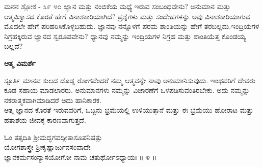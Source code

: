 \newpage
\begin{mananam}{\mananamfont \large ಮನನ ಶ್ಲೋಕ - ೩೯ ೪೦}
\mananamtext ಜ್ಞಾನ ಮತ್ತು ನಂಬಿಕೆಯ ಮಧ್ಯೆ ಇರುವ ಸಂಬಂಧವೇನು? ಅನುಮಾನ ಮತ್ತು ಆತ್ಮವಿಶ್ವಾಸದ ಕೊರತೆ ಹೇಗೆ ವಿನಾಶಕಾರಿಯಾಗಿದೆ? ಪ್ರಶ್ನೆಗಳು ಮತ್ತು ಸಂದೇಹಗಳನ್ನು  ಅವು ವಿನಾಶಕಾರಿಯಾಗುವ ಮೊದಲೇ ಹೇಗೆ ಪರಿಹರಿಸಿಕೊಳ್ಳಬಹುದು. ಜ್ಞಾನವು ನನ್ನೊಳಗೆ ಪರಮ ಶಾಂತಿಯನ್ನು ಹೇಗೆ ತರಬಲ್ಲದು.ಇಂದ್ರಿಯಗಳ ನಿಗ್ರಹಕ್ಕಿರುವ ಜ್ಞಾನದ ಸ್ವರೂಪವೇನು? ಧ್ಯಾನವು ನಮ್ಮನ್ನು  ಇಂದ್ರಿಯಗಳ ನಿಗ್ರಹ ಮತ್ತು ಶಾಂತಿಯೆತ್ತ ಕೊಂಡಯ್ಯ ಬಲ್ಲದೆ?
\end{mananam}
\WritingHand\enspace\textbf{ಆತ್ಮ ವಿಮರ್ಶೆ}\\
\begin{inspiration}{\mananamfont \large ಸ್ಪೂರ್ತಿ}
\mananamtext ಮಾನವ ಕುಲದ ದೊಡ್ಡ ರೋಗವೆಂದರೆ ನಮ್ಮ ಆತ್ಮವನ್ನೇ ನಾವು ಅನುಮಾನಿಸುವುದು. ಇಂಥವರಿಗೆ ದೇವರು ಕೂಡ ಸಹಾಯ ಮಾಡಲಾರರು. ಅನುಮಾನಗಳು ನಮ್ಮನ್ನು ವಿಚಾರಣೆಗೆ ಒಳಪಡಿಸುವಂತಿರಬೇಕು. ಅದು ನಮ್ಮನ್ನು ನಕರಾತ್ಮಕವಾಗಿಮಾಡಿದರೆ ಅದು ಹಾನಿಕಾರಕ.\\
ಆತ್ಮ ಜ್ಞಾನದ ಕೊರತೆ ಇರುವವರಿಗೆ, ಒಬ್ಬನು ಭ್ರಮೆಯಲ್ಲಿ ಉಳಿಯುತ್ತಾನೆ ಮತ್ತು ಈ ಭ್ರಮೆಯು ಹೋರಾಟ ಮತ್ತು ಹತಾಶೆಯ ಜೀವಕ್ಕೆ ಕಾರಣವಾಗುತ್ತದೆ. 
\end{inspiration}
\newpage


\begin{center}
ಓಂ ತತ್ಸದಿತಿ ಶ್ರೀಮದ್ಭಗವದ್ಗೀತಾಸೂಪನಿಷತ್ಸು\\ಯೋಗಶಾಸ್ತ್ರೇ ಶ್ರೀಕೃಷ್ಣಾರ್ಜುನಸಂವಾದೇ\\
ಜ್ಞಾನಕರ್ಮಸಂನ್ಯಾಸಯೋಗೋ ನಾಮ ಚತುರ್ಥೋಽಧ್ಯಾಯಃ ॥ ೪ ॥\\
\end{center}
